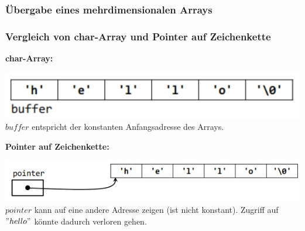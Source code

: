 		\subsubsection{Übergabe eines mehrdimensionalen Arrays}
			
			
		\subsubsection{Vergleich von char-Array und Pointer auf Zeichenkette }
			\begin{minipage}[t]{9 cm}
				\textbf{char-Array:}
				
				\includegraphics[width=1\textwidth]{pics/pointer_char_vergleich_char.jpg}
				$buffer$ entspricht der konstanten Anfangsadresse des Arrays.
			\end{minipage}
			\hspace*{0.5cm}
			\begin{minipage}[t]{9 cm}
				\textbf{Pointer auf Zeichenkette:}
					
					\includegraphics[width=1\textwidth]{pics/pointer_char_vergleich_pointer.jpg}
					$pointer$ kann auf eine andere Adresse zeigen (ist nicht konstant).
					Zugriff auf $"hello"$ könnte dadurch verloren gehen.
			\end{minipage}
			
